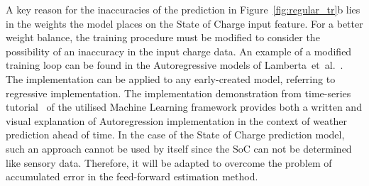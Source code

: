 %
%
A key reason for the inaccuracies of the prediction in \mbox{Figure~\ref{fig:regular_tr}b} lies in the weights the model places on the State of Charge input feature.
For a better weight balance, the training procedure must be modified to consider the possibility of an inaccuracy in the input charge data.
An example of a modified training loop can be found in the Autoregressive models of \mbox{Lamberta et al.~\cite{time_2020}}.
The implementation can be applied to any early-created model, referring to regressive implementation.
 {The implementation demonstration from time-series tutorial~\cite{time_2020} of the utilised Machine Learning framework provides both a written and visual explanation of Autoregression implementation in the context of weather prediction ahead of time.
In the case of the State of Charge prediction model, such an approach cannot be used by itself since the SoC can not be determined like sensory data.
Therefore, it will be adapted to overcome the problem of accumulated error in the feed-forward estimation method.}

